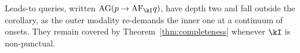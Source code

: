 Leads-to queries, written $\mathrm{AG}(p\rightarrow\mathrm{AF}_\kI q)$, have depth two and
fall outside the corollary, as the outer modality re-demands the inner one at a continuum of onsets. They remain covered by
Theorem~\ref{thm:completeness} whenever $\kI$ is non-punctual.







%

